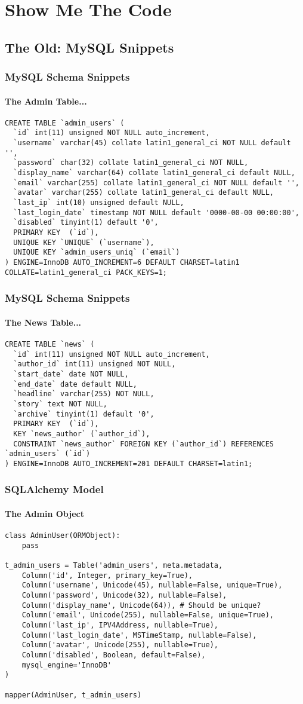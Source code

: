\documentclass{beamer}
\begin{document}
\section{Show Me The Code}
\subsection[The Old: MySQL Snippets]{The Old: MySQL Snippets}

\begin{frame}[fragile]
\frametitle{MySQL Schema Snippets}
\framesubtitle{The Admin Table...}
\begin{lstlisting}
CREATE TABLE `admin_users` (
  `id` int(11) unsigned NOT NULL auto_increment,
  `username` varchar(45) collate latin1_general_ci NOT NULL default '',
  `password` char(32) collate latin1_general_ci NOT NULL,
  `display_name` varchar(64) collate latin1_general_ci default NULL,
  `email` varchar(255) collate latin1_general_ci NOT NULL default '',
  `avatar` varchar(255) collate latin1_general_ci default NULL,
  `last_ip` int(10) unsigned default NULL,
  `last_login_date` timestamp NOT NULL default '0000-00-00 00:00:00',
  `disabled` tinyint(1) default '0',
  PRIMARY KEY  (`id`),
  UNIQUE KEY `UNIQUE` (`username`),
  UNIQUE KEY `admin_users_uniq` (`email`)
) ENGINE=InnoDB AUTO_INCREMENT=6 DEFAULT CHARSET=latin1 COLLATE=latin1_general_ci PACK_KEYS=1;
\end{lstlisting}
\end{frame}
\begin{frame}[fragile]
\frametitle{MySQL Schema Snippets}
\framesubtitle{The News Table...}
\begin{lstlisting}
CREATE TABLE `news` (
  `id` int(11) unsigned NOT NULL auto_increment,
  `author_id` int(11) unsigned NOT NULL,
  `start_date` date NOT NULL,
  `end_date` date default NULL,
  `headline` varchar(255) NOT NULL,
  `story` text NOT NULL,
  `archive` tinyint(1) default '0',
  PRIMARY KEY  (`id`),
  KEY `news_author` (`author_id`),
  CONSTRAINT `news_author` FOREIGN KEY (`author_id`) REFERENCES `admin_users` (`id`)
) ENGINE=InnoDB AUTO_INCREMENT=201 DEFAULT CHARSET=latin1;
\end{lstlisting}
\end{frame}
\begin{frame}[fragile]
\frametitle{SQLAlchemy Model}
\framesubtitle{The Admin Object}
\begin{lstlisting}
class AdminUser(ORMObject):
    pass

t_admin_users = Table('admin_users', meta.metadata,
    Column('id', Integer, primary_key=True),
    Column('username', Unicode(45), nullable=False, unique=True),
    Column('password', Unicode(32), nullable=False),
    Column('display_name', Unicode(64)), # Should be unique?   
    Column('email', Unicode(255), nullable=False, unique=True),
    Column('last_ip', IPV4Address, nullable=True),
    Column('last_login_date', MSTimeStamp, nullable=False),
    Column('avatar', Unicode(255), nullable=True),
    Column('disabled', Boolean, default=False),
    mysql_engine='InnoDB'
)

mapper(AdminUser, t_admin_users)
\end{lstlisting}
\end{frame}
\end{document}
